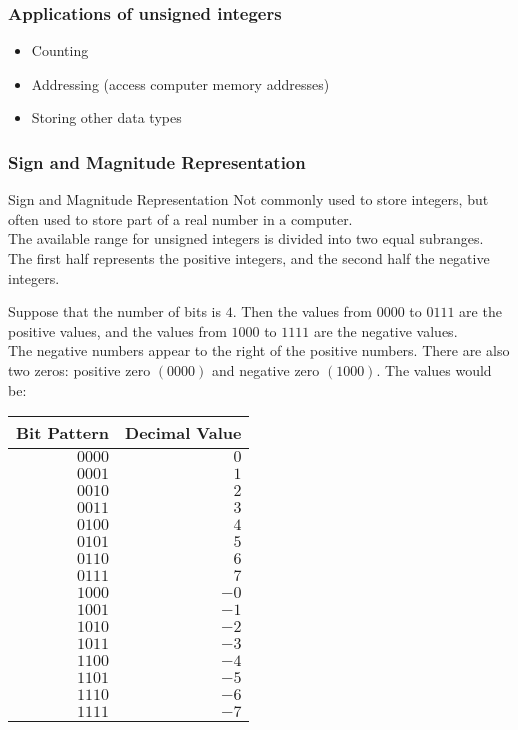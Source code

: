 \documentclass[../notes.tex]{subfiles}
\begin{document}
				\subsubsection{Applications of unsigned integers}
					\begin{itemize}
						\item Counting
						\item Addressing (access computer memory addresses)
						\item Storing other data types
					\end{itemize}
				\subsubsection{Sign and Magnitude Representation}
					\begin{definition}{Sign and Magnitude Representation}
						Not commonly used to store integers, but often used to store part of a real number in a computer.\\
						The available range for unsigned integers is divided into two equal subranges. The first half represents the positive integers, and the second half the negative integers.
					\end{definition}
					\begin{example}
						Suppose that the number of bits is $4$. Then the values from $0000$ to $0111$ are the positive values, and the values from $1000$ to $1111$ are the negative values.\\
						The negative numbers appear to the right of the positive numbers. There are also two zeros: positive zero $(0000)$ and negative zero $(1000)$.
						The values would be:
						\begin{center}
							\begin{tabular}{rr}
								\toprule
								Bit Pattern & Decimal Value\\
								\midrule
								$0000$ & $0$\\
								$0001$ & $1$\\
								$0010$ & $2$\\
								$0011$ & $3$\\
								$0100$ & $4$\\
								$0101$ & $5$\\
								$0110$ & $6$\\
								$0111$ & $7$\\
								$1000$ & $-0$\\
								$1001$ & $-1$\\
								$1010$ & $-2$\\
								$1011$ & $-3$\\
								$1100$ & $-4$\\
								$1101$ & $-5$\\
								$1110$ & $-6$\\
								$1111$ & $-7$\\
								\bottomrule
							\end{tabular}
						\end{center}
					\end{example}
\end{document}

